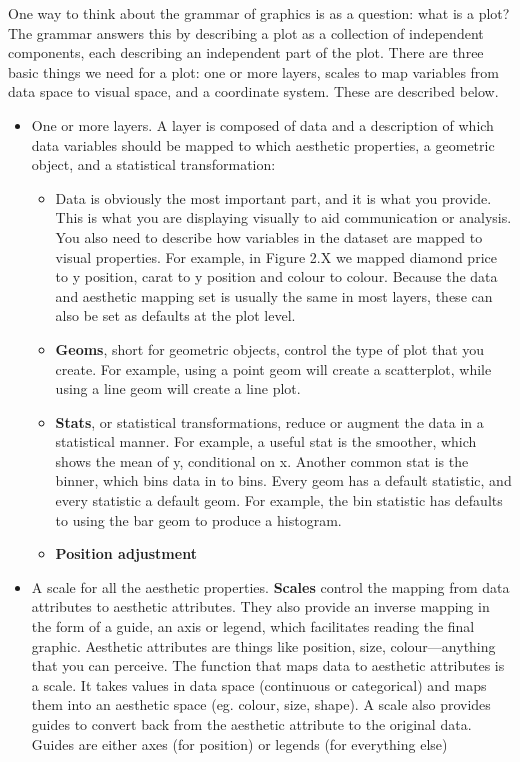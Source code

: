 One way to think about the grammar of graphics is as a question: what is a plot?  The grammar answers this by describing a plot as a collection of independent components, each describing an independent part of the plot.  There are three basic things we need for a plot: one or more layers, scales to map variables from data space to visual space, and a coordinate system.  These are described below.

\begin{itemize}
  \item One or more layers.  A layer is composed of data and a description of which data variables should be mapped to which aesthetic properties, a geometric object, and a statistical transformation:
  
  \begin{itemize}
  	\item Data is obviously the most important part, and it is what you provide.  This is what you are displaying visually to aid communication or analysis.  You also need to describe how variables in the dataset are mapped to visual properties.  For example, in Figure 2.X we mapped diamond price to y position, carat to y position and colour to colour.  Because the data and aesthetic mapping set is usually the same in most layers, these can also be set as defaults at the plot level.
  	
  	\item {\bf Geoms}, short for geometric objects, control the type of plot that you create.  For example, using a point geom will create a scatterplot, while using a line geom will create a line plot.

  	\item {\bf Stats}, or statistical transformations, reduce or augment the data in a statistical manner.  For example, a useful stat is the smoother, which shows the mean of y, conditional on x.  Another common stat is the binner, which bins data in to bins.   Every geom has a default statistic, and every statistic a default geom.  For example, the bin statistic has defaults to using the bar geom to produce a histogram.

  	\item {\bf Position adjustment}
  \end{itemize}

  \item A scale for all the aesthetic properties.  {\bf Scales} control the mapping from data attributes to aesthetic attributes.  They also provide an inverse mapping in the form of a guide, an axis or legend, which facilitates reading the final graphic.  Aesthetic attributes are things like position, size, colour---anything that you can perceive.  The function that maps data to aesthetic attributes is a scale. It takes values in data space (continuous or categorical) and maps them into an aesthetic space (eg. colour, size, shape).  A scale also provides guides to convert back from the aesthetic attribute to the original data.  Guides are either axes (for position) or legends (for everything else)


\end{itemize}
